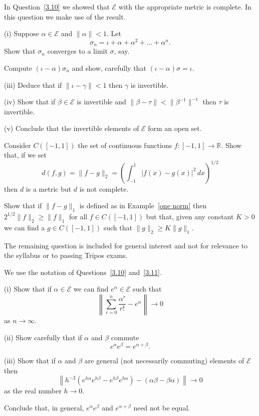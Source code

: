 \begin{question}\label{3.11}
In Question~\ref{3.10}
we showed that $\mathcal{E}$ with
the appropriate metric is complete. In this question
we make use of the result.

(i) Suppose $\alpha\in\mathcal{E}$ and $\|\alpha\|<1$.
Let 
\[\sigma_{n}=\iota+\alpha+\alpha^{2}+\dots+\alpha^{n}.\]
Show that $\sigma_{n}$ converges to a limit $\sigma$,
say.

Compute $(\iota-\alpha)\sigma_{n}$ and show, carefully
that $(\iota-\alpha)\sigma=\iota$.

(iii) Deduce that if $\|\iota-\gamma\|<1$ then $\gamma$
is invertible.

(iv) Show that if $\beta\in\mathcal{E}$ is invertible
and $\|\beta-\tau\|<\|\beta^{-1}\|^{-1}$ then $\tau$
is invertible.

(v) Conclude that the invertible elements of ${\mathcal E}$
form an open set.
\end{question}
\begin{question}  
Consider $C([-1,1])$ the set of continuous
functions $f:[-1,1]\rightarrow{\mathbb R}$. Show that,
if we set
\[d(f,g)=\|f-g\|_{2}=
\left(\int_{-1}^{1}|f(x)-g(x)|^{2}\,dx\right)^{1/2}\]
then $d$ is a metric but $d$ is not complete.

Show that if $\|f-g\|_{1}$ is defined as in
Example~\ref{one norm} then $2^{1/2}\|f\|_{2}\geq \|f\|_{1}$
for all $f\in C([-1,1])$ but that, given any
constant $K>0$ we can find a $g\in C([-1,1])$
such that $\|g\|_{2}\geq K\|g\|_{1}$.
\end{question}

\vspace{1\baselineskip}

The remaining question is included for general interest
and not for relevance to the syllabus or to passing Tripos exams.
\vspace{1\baselineskip}

\begin{question}
We use the notation of Questions~\ref{3.10} and~\ref{3.11}.

(i) Show that if $\alpha\in\mathcal{E}$ we can find
$e^{\alpha}\in\mathcal{E}$ such that
\[\left\|\sum_{r=0}^{n}\frac{\alpha^{r}}{r!}
-e^{\alpha}\right\|\rightarrow 0\]
as $n\rightarrow\infty$.

(ii) Show carefully that if $\alpha$ and $\beta$ commute
\[e^{\alpha}e^{\beta}=e^{\alpha+\beta}.\]

(iii) Show that if $\alpha$ and $\beta$ are general
(not necessarily commuting) elements of ${\mathcal E}$
then
\[\left\|h^{-2}(e^{h\alpha}e^{h\beta}-e^{h\beta}e^{h\alpha})
-(\alpha\beta-\beta\alpha)\right\|\rightarrow 0\]
as the real number $h\rightarrow 0$.

Conclude that, in general, $e^{\alpha}e^{\beta}$
and $e^{\alpha+\beta}$ need not be equal.
\end{question}
\newpage
